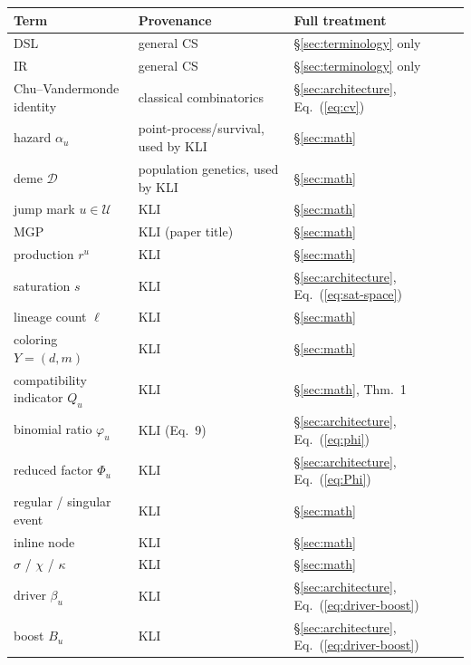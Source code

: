 \documentclass[11pt,leqno]{article}
\newcommand{\Jumps}{\mathcal{U}}    %
\newcommand{\Demes}{\mathcal{D}}    %
\theoremstyle{plain}
\theoremstyle{definition}
\begin{document}
\begin{center}
\renewcommand{\arraystretch}{1.15}
\begin{tabular}{lll}
\toprule
\textbf{Term} & \textbf{Provenance} & \textbf{Full treatment} \\
\midrule
DSL                              & general CS  & \S\ref{sec:terminology} only \\
IR                               & general CS  & \S\ref{sec:terminology} only \\
Chu--Vandermonde identity        & classical combinatorics & \S\ref{sec:architecture}, Eq.~(\ref{eq:cv}) \\
hazard $\alpha_u$                & point-process/survival, used by KLI
                                 & \S\ref{sec:math} \\
deme $\Demes$                    & population genetics, used by KLI
                                 & \S\ref{sec:math} \\
jump mark $u \in \Jumps$         & KLI  & \S\ref{sec:math} \\
MGP                              & KLI (paper title)  & \S\ref{sec:math} \\
production $r^u$                 & KLI  & \S\ref{sec:math} \\
saturation $s$                   & KLI  & \S\ref{sec:architecture}, Eq.~(\ref{eq:sat-space}) \\
lineage count $\ell$             & KLI  & \S\ref{sec:math} \\
coloring $Y = (d,m)$             & KLI  & \S\ref{sec:math} \\
compatibility indicator $Q_u$    & KLI  & \S\ref{sec:math}, Thm.~1 \\
binomial ratio $\varphi_u$       & KLI (Eq.~9)  & \S\ref{sec:architecture}, Eq.~(\ref{eq:phi}) \\
reduced factor $\Phi_u$          & KLI  & \S\ref{sec:architecture}, Eq.~(\ref{eq:Phi}) \\
regular / singular event         & KLI  & \S\ref{sec:math} \\
inline node                      & KLI  & \S\ref{sec:math} \\
$\sigma$ / $\chi$ / $\kappa$     & KLI  & \S\ref{sec:math} \\
driver $\beta_u$                 & KLI  & \S\ref{sec:architecture}, Eq.~(\ref{eq:driver-boost}) \\
boost $B_u$                      & KLI  & \S\ref{sec:architecture}, Eq.~(\ref{eq:driver-boost}) \\

\end{tabular}
\end{center}
\end{document}
